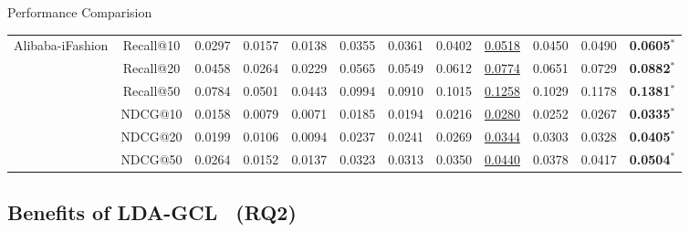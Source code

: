 \documentclass[t]{beamer}
\begin{document}
\begin{frame}{Performance Comparision}
\begin{table}
{\begin{tabular}{@{}c|c|ccc|ccc|cccc}
\multirow{6}{*}{Alibaba-iFashion} 
& Recall@10 & 0.0297 & 0.0157 & 0.0138 & 0.0355 & 0.0361 & 0.0402 & \underline{0.0518} & 0.0450 & 0.0490 & \textbf{0.0605}$^*$ \\
& Recall@20 & 0.0458 & 0.0264 & 0.0229 & 0.0565 & 0.0549 & 0.0612 & \underline{0.0774} & 0.0651 & 0.0729 & \textbf{0.0882}$^*$ \\
& Recall@50 & 0.0784 & 0.0501 & 0.0443 & 0.0994 & 0.0910 & 0.1015 & \underline{0.1258} & 0.1029 & 0.1178 & \textbf{0.1381}$^*$ \\
& NDCG@10 & 0.0158 & 0.0079 & 0.0071 & 0.0185 & 0.0194 & 0.0216 & \underline{0.0280} & 0.0252 & 0.0267 & \textbf{0.0335}$^*$  \\
& NDCG@20 & 0.0199 & 0.0106 & 0.0094 & 0.0237 & 0.0241 & 0.0269 & \underline{0.0344} & 0.0303 & 0.0328 & \textbf{0.0405}$^*$ \\
& NDCG@50 & 0.0264 & 0.0152 & 0.0137 & 0.0323 & 0.0313 & 0.0350 & \underline{0.0440} & 0.0378 & 0.0417 & \textbf{0.0504}$^*$  \\

\bottomrule
\end{tabular}
}

\end{table}
\end{frame}




\subsection{Benefits of LDA-GCL~ (RQ2)}
\label{sec:add_graph}
\end{document}
